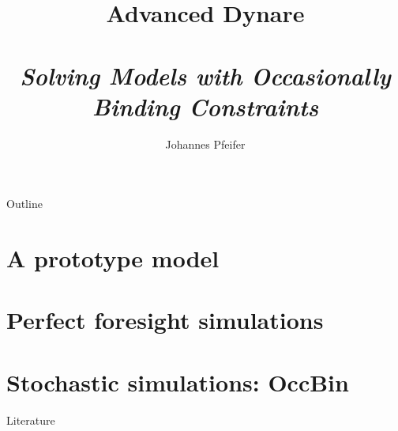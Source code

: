 \documentclass[handout,usepdftitle=false,xcolor=dvipsnames,aspectratio=169]{beamer}
\title[]{\textbf{Advanced Dynare\\}
\medskip{Chapter XIII}\\
\emph{Solving Models with Occasionally Binding Constraints}
}
\author{Johannes Pfeifer}
\begin{document}
\begin{frame}
  \titlepage
\end{frame}



\begin{frame}{Outline}
  \tableofcontents
\end{frame}

\section[Prototype model]{A prototype model}
 



\section[Perfect foresight]{Perfect foresight simulations}


\section{Stochastic simulations: OccBin}


%

%

%

%

%
\begin{frame}[allowframebreaks]{Literature}
\printbibliography
\end{frame}
\end{document}
